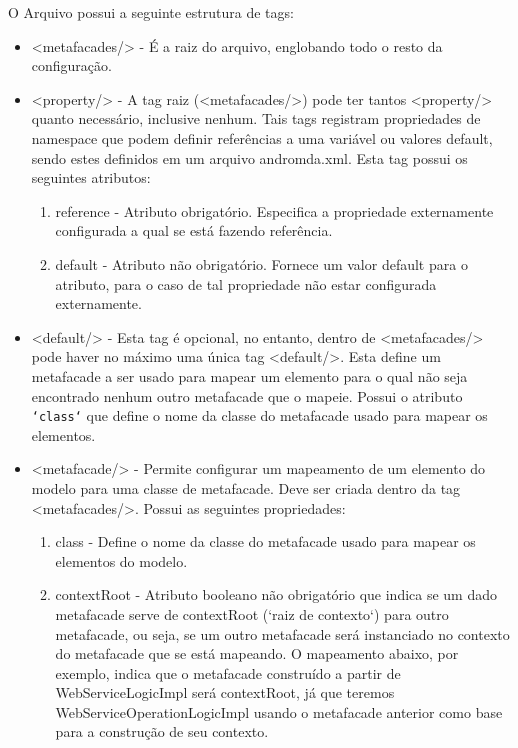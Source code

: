 O Arquivo possui a seguinte estrutura de tags:

\begin{itemize}
  \item <metafacades/> - É a raiz do arquivo, englobando todo o resto da 
  configuração. 
  \item <property/> - A tag raiz (<metafacades/>) pode ter tantos <property/>
  quanto necessário, inclusive nenhum. Tais tags registram propriedades
  de namespace que podem definir referências a uma variável ou valores default,
  sendo estes definidos em um arquivo andromda.xml. Esta tag possui os seguintes
  atributos:
  \begin{enumerate}
    \item reference - Atributo obrigatório. Especifica a propriedade
    externamente configurada a qual se está fazendo referência.
    \item default - Atributo não obrigatório. Fornece um valor default para o
    atributo, para o caso de tal propriedade não estar configurada externamente.
  \end{enumerate}
  
  \item <default/> - Esta tag é opcional, no entanto, dentro de <metafacades/>
  pode haver no máximo uma única tag <default/>. Esta define um metafacade a ser
  usado para mapear um elemento para o qual não seja encontrado nenhum outro
  metafacade que o mapeie. Possui o atributo \texttt{`class`} que define o nome
  da classe do metafacade usado para mapear os elementos. 
  \item <metafacade/> - Permite configurar um mapeamento de um elemento do
  modelo para uma classe de metafacade. Deve ser criada dentro da tag
  <metafacades/>. Possui as seguintes propriedades:
  \begin{enumerate}
    \item class - Define o nome
    da classe do metafacade usado para mapear os elementos do modelo.
    \item contextRoot - Atributo booleano não obrigatório que indica se
    um dado metafacade serve de contextRoot (`raiz de contexto`) para
    outro metafacade, ou seja, se um outro metafacade será instanciado
    no contexto do metafacade que se está mapeando. O mapeamento abaixo, por
    exemplo, indica que o metafacade construído a partir de
    WebServiceLogicImpl será contextRoot, já que teremos
    WebServiceOperationLogicImpl usando o metafacade anterior como base para a
    construção de seu contexto.
    

\end{enumerate}
\end{itemize}
